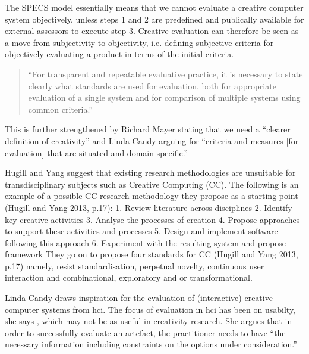 The SPECS model essentially means that we cannot evaluate a creative computer system objectively, unless steps 1 and 2 are predefined and publically available for external assessors to execute step 3. Creative evaluation can therefore be seen as a move from subjectivity to objectivity, i.e. defining subjective criteria for objectively evaluating a product in terms of the initial criteria.

\begin{quotation}
  ``For transparent and repeatable evaluative practice, it is necessary to state clearly what standards are used for evaluation, both for appropriate evaluation of a single system and for comparison of multiple systems using common criteria.'' \cite{Jordanous2012a}
\end{quotation}

This is further strengthened by Richard Mayer stating that we need a ``clearer definition of creativity'' \cite{Mayer1999} and Linda Candy arguing for ``criteria and measures [for evaluation] that are situated and domain specific.'' \cite{Candy2012}



\begin{draft}
  Hugill and Yang suggest that existing research methodologies are unsuitable for transdisciplinary subjects such as Creative Computing (CC). The following is an example of a possible CC research methodology they propose as a starting point (Hugill and Yang 2013, p.17):
  1. Review literature across disciplines
  2. Identify key creative activities
  3. Analyse the processes of creation
  4. Propose approaches to support these activities and processes 5. Design and implement software following this approach
  6. Experiment with the resulting system and propose framework
  They go on to propose four standards for CC (Hugill and Yang 2013, p.17) namely, resist standardisation, perpetual novelty, continuous user interaction and combinational, exploratory and or transformational.
\end{draft}


\spirals

Linda Candy draws inspiration for the evaluation of (interactive) creative computer systems from \gls{hci}. The focus of evaluation in \gls{hci} has been on usabilty, she says \autocite[p.23]{Candy2012}, which may not be as useful in creativity research. She argues that in order to successfully evaluate an artefact, the practitioner needs to have ``the necessary information including constraints on the options under consideration.'' \autocite[p.7]{Candy2012}

